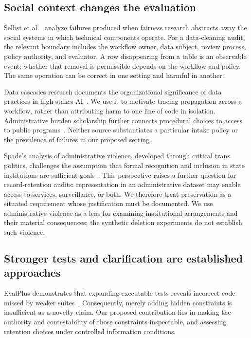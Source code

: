 \documentclass[manuscript,screen,review,anonymous]{acmart}
\begin{document}
\subsection{Social context changes the evaluation}
Selbst et al.~\cite{selbst2019} analyze failures produced when fairness research abstracts away the social systems in which technical components operate. For a data-cleaning audit, the relevant boundary includes the workflow owner, data subject, review process, policy authority, and evaluator. A row disappearing from a table is an observable event; whether that removal is permissible depends on the workflow and policy. The same operation can be correct in one setting and harmful in another.

Data cascades research documents the organizational significance of data practices in high-stakes AI~\cite{sambasivan2021}. We use it to motivate tracing propagation across a workflow, rather than attributing harm to one line of code in isolation. Administrative burden scholarship further connects procedural choices to access to public programs~\cite{herd2018}. Neither source substantiates a particular intake policy or the prevalence of failures in our proposed setting.

Spade's analysis of administrative violence, developed through critical trans politics, challenges the assumption that formal recognition and inclusion in state institutions are sufficient goals~\cite{spade2015}. This perspective raises a further question for record-retention audits: representation in an administrative dataset may enable access to services, surveillance, or both. We therefore treat preservation as a situated requirement whose justification must be documented. We use administrative violence as a lens for examining institutional arrangements and their material consequences; the synthetic deletion experiments do not establish such violence.

\subsection{Stronger tests and clarification are established approaches}
EvalPlus demonstrates that expanding executable tests reveals incorrect code missed by weaker suites~\cite{liu2023}. Consequently, merely adding hidden constraints is insufficient as a novelty claim. Our proposed contribution lies in making the authority and contestability of those constraints inspectable, and assessing retention choices under controlled information conditions.
\end{document}
